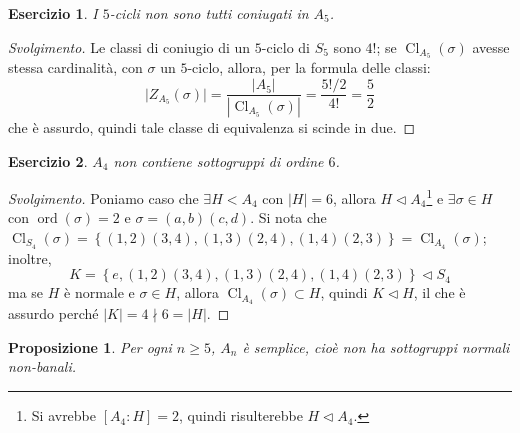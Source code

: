 \documentclass[12pt]{scrartcl}
\theoremstyle{style}
\newtheorem{prop}{Proposizione}[section]
\newtheorem{esercizio}{Esercizio}[section]
\newenvironment{svolgimento}{\renewcommand\qedsymbol{$\blacksquare$}\begin{proof}[Svolgimento]}{\end{proof}}
\numberwithin{equation}{subsection}
\begin{document}
\begin{esercizio}
I $5$-cicli non sono tutti coniugati in $A_5$.
\end{esercizio}
\begin{svolgimento}
	Le classi di coniugio di un $5$-ciclo di $S_5$ sono $4!$; se $\operatorname{Cl} _{A_5} (\sigma )$ avesse stessa cardinalit\`a, con $\sigma $ un $5$-ciclo, allora, per la formula delle classi:
	\[
	\lvert Z_{A_5} (\sigma ) \rvert  = \frac{\lvert A_5 \rvert }{|\operatorname{Cl} _{A_5} (\sigma )|}= \frac{5! /2 }{4!} = \frac{5}{2}
	\] 
	che \`e assurdo, quindi tale classe di equivalenza si scinde in due.
\end{svolgimento}
\begin{esercizio}
$A_4$ non contiene sottogruppi di ordine $6$.
\end{esercizio}
\begin{svolgimento}
	Poniamo caso che $\exists H < A_4$ con $|H| = 6$, allora $H \lhd A_4$\footnote{Si avrebbe $[A_4:H] = 2$, quindi risulterebbe $H\lhd A_4$.} e $\exists \sigma  \in H$ con $\operatorname{ord}(\sigma ) =2$ e $\sigma = (a,b)(c,d)$. 
	Si nota che $\operatorname{Cl}_{S_4} (\sigma ) = \left\{ (1,2)(3,4),(1,3)(2,4),(1,4)(2,3) \right\} = \operatorname{Cl} _{A_4} (\sigma )$; inoltre,
\[
K = \left\{e, (1,2)(3,4),(1,3)(2,4),(1,4)(2,3) \right\}\lhd S_4
\] 
	ma se $H$ \`e normale e $\sigma  \in H$, allora $\operatorname{Cl} _{A_4} (\sigma ) \subset H$, quindi $K \lhd H$, il che \`e assurdo perch\'e $\lvert K \rvert =4  \nmid 6 = \lvert H \rvert $.
\end{svolgimento}
\begin{prop}
	Per ogni $n\ge 5$, $A_n$ \`e semplice, cio\`e non ha sottogruppi normali non-banali.
\end{prop}
\end{document}

